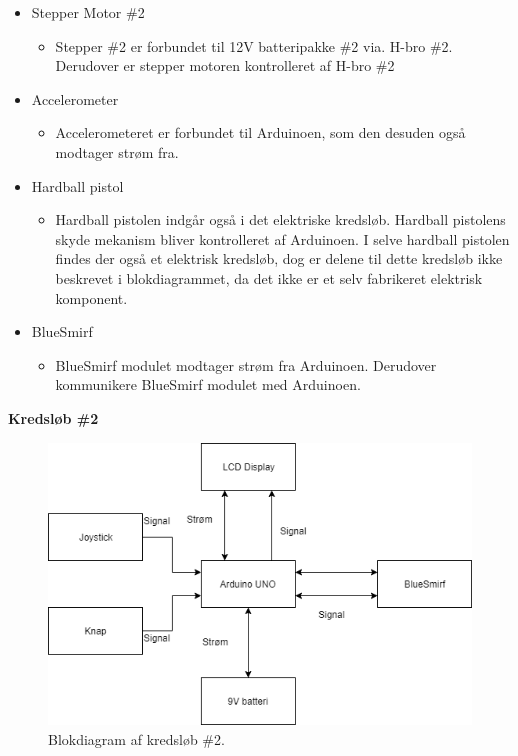 \begin{itemize}
	\item Stepper Motor \#2
\begin{itemize}
\item Stepper \#2 er forbundet til 12V  batteripakke \#2 via. H-bro \#2. Derudover er stepper motoren kontrolleret af H-bro \#2
\end{itemize}

	\item Accelerometer
\begin{itemize}
\item Accelerometeret er forbundet til Arduinoen, som den desuden også modtager strøm fra.
\end{itemize}

	\item Hardball pistol 
\begin{itemize}
\item Hardball pistolen indgår også i det elektriske kredsløb. Hardball pistolens skyde mekanism bliver kontrolleret af Arduinoen. I selve hardball pistolen findes der også et elektrisk kredsløb, dog er delene til dette kredsløb ikke beskrevet i blokdiagrammet, da det ikke er et selv fabrikeret elektrisk komponent. 	
\end{itemize}

\item BlueSmirf
\begin{itemize}
\item BlueSmirf modulet modtager strøm fra Arduinoen. Derudover kommunikere BlueSmirf modulet med Arduinoen.
\end{itemize}

\end{itemize}



\textbf{{\normalsize Kredsløb \#2}}

\begin{figure}[H]
\centering
\includegraphics[scale=0.8]{Billeder/Kredsloeb2.png}
\caption{Blokdiagram af kredsløb \#2.}
\label{fig:Blokdiagram2}
\end{figure}


